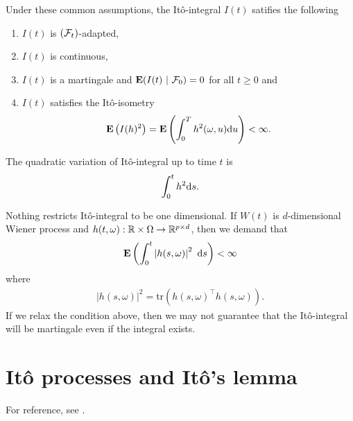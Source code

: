 Under these common assumptions, the It\^{o}-integral $I(t)$ satifies the following
	\begin{enumerate}
		\item $I(t)$ is $(\mathcal{F}_t)$-adapted,
		\item $I(t)$ is continuous,
		\item $I(t)$ is a martingale and $\operatorname{\boldsymbol{\mathrm{E}}}( I(t) \ | \ \mathcal{F}_0 ) = 0$ for all $t \geq 0$ and
		\item $I(t)$ satisfies the It\^{o}-isometry
		\begin{align}
		\operatorname{\boldsymbol{\mathrm{E}}} \left( I(h)^2 \right) = \operatorname{\boldsymbol{\mathrm{E}}} \left( \int_0^T h^2 (\omega,u) \mathrm{d} u \right) < \infty .
		\end{align}
	\end{enumerate}

The  quadratic variation of It\^{o}-integral up to time $t$ is
  \begin{align}
    \int_0^t h^2 \mathrm{d} s .
  \end{align}
  
Nothing restricts It\^{o}-integral to be one dimensional. If $W(t)$ is $d$-dimensional Wiener process and $h(t, \omega) : \mathbb{R} \times \Omega \rightarrow \mathbb{R}^{p \times d}$, then we demand that
	\begin{align}
		\operatorname{\boldsymbol{\mathrm{E}}} \left( \int_0^t \left| h(s, \omega) \right|^2 \ \mathrm{d} s \right) < \infty 
	\end{align}
where
	\begin{align}
		\left| h(s, \omega) \right|^2 = \mathrm{tr} ( h(s, \omega)^{\top} h(s, \omega) ) .
	\end{align}
If we relax the condition above, then we may not guarantee that the It\^{o}-integral will be martingale even if the integral exists.
  
\section{It\^{o} processes and It\^{o}'s lemma}
\label{sec:itoprocess}

For reference, see \textcite[pp. 21--55]{oksendal2003stochastic}.


